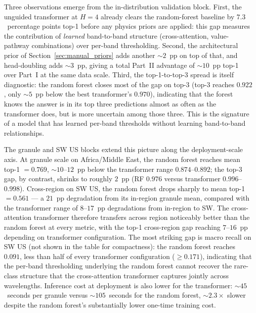 \documentclass[11pt]{report}
\begin{document}
Three observations emerge from the in-distribution validation block. First, the unguided transformer at $H = 4$ already clears the random-forest baseline by $7.3$~percentage points top-1 before any physics priors are applied: this gap measures the contribution of \emph{learned} band-to-band structure (cross-attention, value-pathway combinations) over per-band thresholding. Second, the architectural prior of Section~\ref{sec:manual_priors} adds another $\sim$$2$~pp on top of that, and head-doubling adds $\sim$$3$~pp, giving a total Part~II advantage of $\sim$$10$~pp top-1 over Part~I at the same data scale. Third, the top-1-to-top-3 spread is itself diagnostic: the random forest closes most of the gap on top-3 (top-3 reaches $0.922$, only $\sim$$5$~pp below the best transformer's $0.970$), indicating that the forest knows the answer is in its top three predictions almost as often as the transformer does, but is more uncertain among those three. This is the signature of a model that has learned per-band thresholds without learning band-to-band relationships.

The granule and SW US blocks extend this picture along the deployment-scale axis. At granule scale on Africa/Middle East, the random forest reaches mean top-1 $= 0.769$, $\sim$$10$--$12$~pp below the transformer range $0.874$--$0.892$; the top-3 gap, by contrast, shrinks to roughly $2$~pp (RF $0.976$ versus transformer $0.996$--$0.998$). Cross-region on SW US, the random forest drops sharply to mean top-1 $= 0.561$ --- a $21$~pp degradation from its in-region granule mean, compared with the transformer range of $8$--$17$~pp degradations from in-region to SW. The cross-attention transformer therefore transfers across region noticeably better than the random forest at every metric, with the top-1 cross-region gap reaching $7$--$16$~pp depending on transformer configuration. The most striking gap is macro recall on SW US (not shown in the table for compactness): the random forest reaches $0.091$, less than half of every transformer configuration ($\geq 0.171$), indicating that the per-band thresholding underlying the random forest cannot recover the rare-class structure that the cross-attention transformer captures jointly across wavelengths. Inference cost at deployment is also lower for the transformer: $\sim$$45$~seconds per granule versus $\sim$$105$~seconds for the random forest, $\sim$$2.3\times$ slower despite the random forest's substantially lower one-time training cost.
\end{document}
